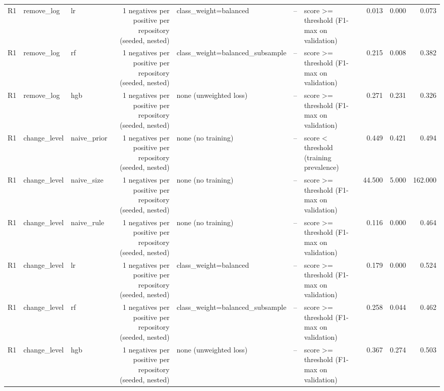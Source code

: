 \begin{table}[htbp]
{\begin{tabular}{lllrlrlrrr}
R1 & remove\_log & lr & 1 negatives per positive per repository (seeded, nested) & class\_weight=balanced & -- & score >= threshold (F1-max on validation) & 0.013 & 0.000 & 0.073 \\
R1 & remove\_log & rf & 1 negatives per positive per repository (seeded, nested) & class\_weight=balanced\_subsample & -- & score >= threshold (F1-max on validation) & 0.215 & 0.008 & 0.382 \\
R1 & remove\_log & hgb & 1 negatives per positive per repository (seeded, nested) & none (unweighted loss) & -- & score >= threshold (F1-max on validation) & 0.271 & 0.231 & 0.326 \\
R1 & change\_level & naive\_prior & 1 negatives per positive per repository (seeded, nested) & none (no training) & -- & score < threshold (training prevalence) & 0.449 & 0.421 & 0.494 \\
R1 & change\_level & naive\_size & 1 negatives per positive per repository (seeded, nested) & none (no training) & -- & score >= threshold (F1-max on validation) & 44.500 & 5.000 & 162.000 \\
R1 & change\_level & naive\_rule & 1 negatives per positive per repository (seeded, nested) & none (no training) & -- & score >= threshold (F1-max on validation) & 0.116 & 0.000 & 0.464 \\
R1 & change\_level & lr & 1 negatives per positive per repository (seeded, nested) & class\_weight=balanced & -- & score >= threshold (F1-max on validation) & 0.179 & 0.000 & 0.524 \\
R1 & change\_level & rf & 1 negatives per positive per repository (seeded, nested) & class\_weight=balanced\_subsample & -- & score >= threshold (F1-max on validation) & 0.258 & 0.044 & 0.462 \\
R1 & change\_level & hgb & 1 negatives per positive per repository (seeded, nested) & none (unweighted loss) & -- & score >= threshold (F1-max on validation) & 0.367 & 0.274 & 0.503 \\
\bottomrule
\end{tabular}}
\end{table}
